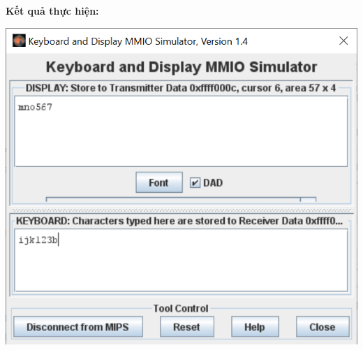 \documentclass[12pt,a4paper,oneside]{article}
\begin{document}
\textbf{Kết quả thực hiện:}
\begin{center}
\includegraphics[scale=1]{9}
\end{center}
\end{document}

